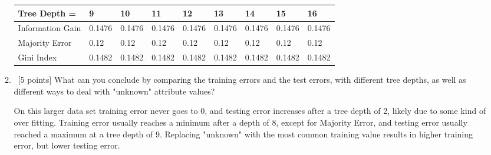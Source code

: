 \documentclass[12pt, fullpage,letterpaper]{article}
\begin{document}
\begin{enumerate}
\begin{enumerate}
	\begin{table}[!h]
		\begin{tabular}{l||llllllll}
			Tree Depth = & 9 & 10 & 11 & 12 & 13 & 14 & 15 & 16 \\
			\hline\hline
			Information Gain & 0.1476 & 0.1476 & 0.1476 & 0.1476 & 0.1476 & 0.1476 & 0.1476 & 0.1476 \\
			Majority Error & 0.12 & 0.12 & 0.12 & 0.12 & 0.12 & 0.12 & 0.12 & 0.12 \\
			Gini Index & 0.1482 & 0.1482 & 0.1482 & 0.1482 & 0.1482 & 0.1482 & 0.1482 & 0.1482 \\
		\end{tabular}
	\end{table}

	\item~[5 points] What can you conclude by comparing the training errors and the test errors, with different tree depths, as well as different ways to deal with "unknown" attribute values?
	\begin{framed}
		  \newline
		On this larger data set training error never goes to 0, and testing error increases after a tree depth of 2, likely due to some kind of over fitting. Training error usually reaches a minimum after a depth of 8, except for Majority Error, and testing error usually reached a maximum at a tree depth of 9. Replacing "unknown" with the most common training value results in higher training error, but lower testing error.
	\end{framed}
\end{enumerate}
\end{enumerate}
\end{document}
